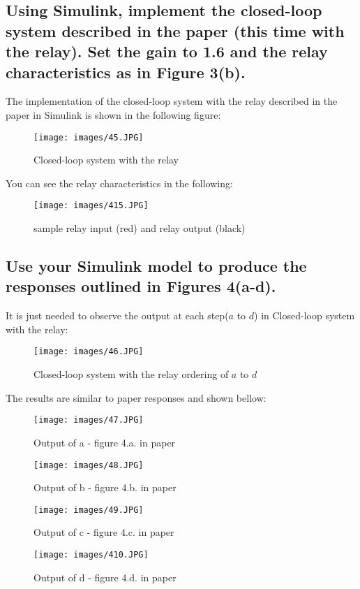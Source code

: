 \documentclass[11pt]{scrartcl} %
\begin{document}
\subsection{Using Simulink, implement the closed-loop system described in the paper (this time with the relay). Set the gain to 1.6 and the relay characteristics as in Figure 3(b).}
The implementation of the closed-loop system with the relay described in the paper in Simulink is shown in the following figure:

\begin{figure}[H]
	\centering
	\texttt{[image: images/45.JPG]}
	\caption{Closed-loop system with the relay}
\end{figure}
You can see the relay characteristics in the following:
\begin{figure}[H]
	\centering
	\texttt{[image: images/415.JPG]}
	\caption{sample relay input (red) and relay output (black)}
\end{figure}
\subsection{Use your Simulink model to produce the responses outlined in Figures 4(a-d).}
It is just needed to observe the output at each step($a$ to $d$) in Closed-loop system with the relay:
\begin{figure}[H]
	\centering
	\texttt{[image: images/46.JPG]}
	\caption{Closed-loop system with the relay ordering of $a$ to $d$}
\end{figure}
The results are similar to paper responses and shown bellow:
\begin{figure}[H]
	\centering
	\texttt{[image: images/47.JPG]}
	\caption{Output of a - figure 4.a. in paper}
\end{figure}
\begin{figure}[H]
	\centering
	\texttt{[image: images/48.JPG]}
	\caption{Output of b - figure 4.b. in paper}
\end{figure}
\begin{figure}[H]
	\centering
	\texttt{[image: images/49.JPG]}
	\caption{Output of c - figure 4.c. in paper}
\end{figure}
\begin{figure}[H]
	\centering
	\texttt{[image: images/410.JPG]}
	\caption{Output of d - figure 4.d. in paper}
\end{figure}
\end{document}
